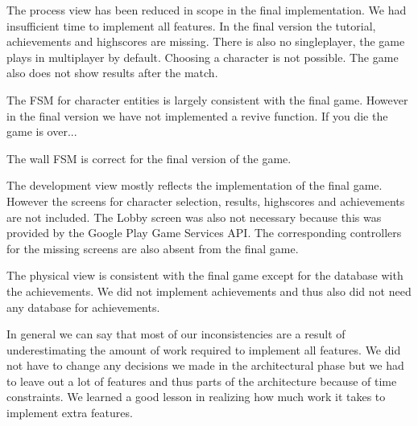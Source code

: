 

The process view has been reduced in scope in the final implementation. We had insufficient time to implement all features. In the final version the tutorial, achievements and highscores are missing. There is also no singleplayer, the game plays in multiplayer by default. Choosing a character is not possible. The game also does not show results after the match.



The FSM for character entities is largely consistent with the final game. However in the final version we have not implemented a revive function. If you die the game is over...

The wall FSM is correct for the final version of the game.


The development view mostly reflects the implementation of the final game. However the screens for character selection, results, highscores and achievements are not included. The Lobby screen was also not necessary because this was provided by the Google Play Game Services API. The corresponding controllers for the missing screens are also absent from the final game.


The physical view is consistent with the final game except for the database with the achievements. We did not implement achievements and thus also did not need any database for achievements.


In general we can say that most of our inconsistencies are a result of underestimating the amount of work required to implement all features. We did not have to change any decisions we made in the architectural phase but we had to leave out a lot of features and thus parts of the architecture because of time constraints. We learned a good lesson in realizing how much work it takes to implement extra features.

